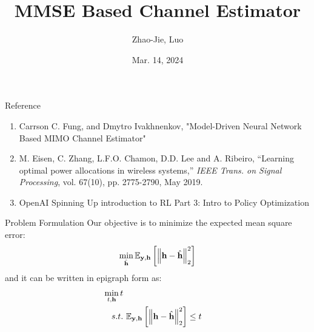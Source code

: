 \documentclass[hyperref={bookmarks=false}]{beamer}
\title{MMSE Based Channel Estimator}
\author{Zhao-Jie, Luo}
\institute[NYCU] %
{
\textit{janny00kevin@gmail.com} %
\\
\medskip
Advisor: Professor Carrson C. Fung\\ 
\medskip
National Yang Ming Chiao Tung University \\ %
}
\date{Mar. 14, 2024}
\begin{document}
\frame{\titlepage}

\begin{frame}{Reference}
\begin{enumerate}
    \item  Carrson C. Fung, and Dmytro Ivakhnenkov, "Model-Driven Neural Network Based MIMO Channel Estimator"
    \item M. Eisen, C. Zhang, L.F.O. Chamon, D.D. Lee and A. Ribeiro, ``Learning optimal power allocations in wireless systems,'' \emph{IEEE Trans. on Signal Processing}, vol. 67(10), pp. 2775-2790, May 2019.
    \item OpenAI Spinning Up introduction to RL Part 3: Intro to Policy Optimization %
\end{enumerate}

\end{frame}


\begin{frame}{Problem Formulation}
Our objective is to minimize the expected mean square error:
\begin{align*}
    \min_{\hat{{\bf h}}} \mathbb{E}_{{\bf y},{\bf h}}\left[\left\| {\bf h}-\hat{{\bf h}} \right\|^2_2 \right]\\
\end{align*}
and it can be written in epigraph form as:
\begin{align*}
    \min_{t,{\bf h}} {t}\\
    s.t. &\ \mathbb{E}_{{\bf y},{\bf h}}\left[\left\| {\bf h}-\hat{{\bf h}} \right\|^2_2 \right] \leq t\\
\end{align*}

\end{frame}
\end{document}
